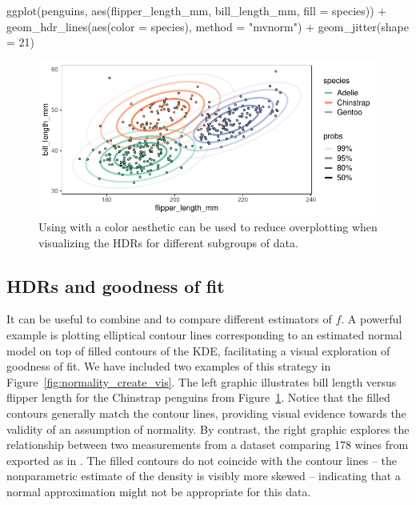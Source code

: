 \begin{knitrout}
\color{fgcolor}\begin{kframe}
\begin{example}
ggplot(penguins, aes(flipper_length_mm, bill_length_mm, fill = species)) +
  geom_hdr_lines(aes(color = species), method = "mvnorm") +
  geom_jitter(shape = 21)
\end{example}
\end{kframe}
\end{knitrout}
\begin{knitrout}
\color{fgcolor}\begin{figure}[h!]

{\centering \includegraphics[width=\maxwidth]{figures/palmer_penguins-1}

}

\caption{Using  with a color aesthetic can be used to reduce overplotting when visualizing the HDRs for different subgroups of data.}\label{fig:palmer_penguins}
\end{figure}

\end{knitrout}


\subsection{HDRs and goodness of fit}\label{sec:hdr-gof}

It can be useful to combine  and  to compare different estimators of $f$.
A powerful example is plotting elliptical contour lines corresponding to an estimated normal model on top of filled contours of the KDE, facilitating a visual exploration of goodness of fit.
We have included two examples of this strategy in Figure~\ref{fig:normality_create_vis}.
The left graphic illustrates bill length versus flipper length for the Chinstrap penguins from Figure~\ref{fig:palmer_penguins}.
Notice that the filled contours generally match the contour lines, providing visual evidence towards the validity of an assumption of normality.
By contrast, the right graphic explores the relationship between two measurements from a dataset comparing 178 wines from \cite{forina_multivariate_1986} exported as  in  \citep{azzalini_sn_2022}.
The filled contours do not coincide with the contour lines -- the nonparametric estimate of the density is visibly more skewed -- indicating that a normal approximation might not be appropriate for this data.

